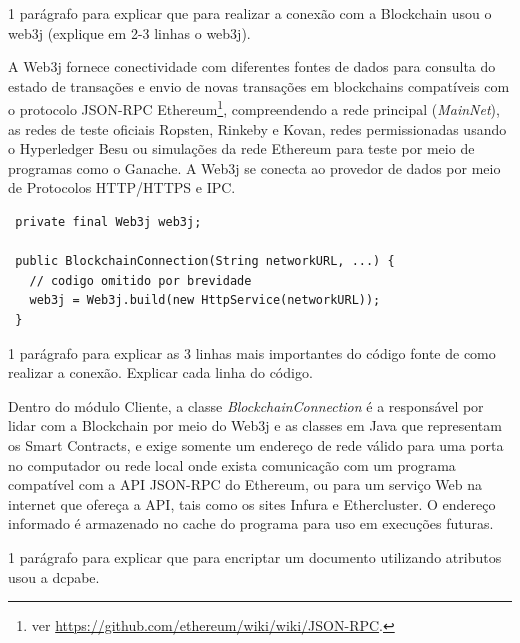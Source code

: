 \documentclass[a4paper,11pt]{article}
\begin{document}
{\color{Magenta} 1 parágrafo para explicar que para realizar a conexão com a Blockchain usou o web3j (explique em 2-3 linhas o web3j).}

A Web3j fornece conectividade com diferentes fontes de dados para consulta do estado de transações e envio de novas transações em blockchains compatíveis com o protocolo JSON-RPC Ethereum\footnote{ver \href{https://github.com/ethereum/wiki/wiki/JSON-RPC}{https://github.com/ethereum/wiki/wiki/JSON-RPC}.}, compreendendo a rede principal (\emph{MainNet}), as redes de teste oficiais Ropsten, Rinkeby e Kovan, redes permissionadas usando o Hyperledger Besu ou simulações da rede Ethereum para teste por meio de programas como o Ganache.
A Web3j se conecta ao provedor de dados por meio de Protocolos HTTP/HTTPS e IPC.


\begin{lstlisting}
 private final Web3j web3j;

 public BlockchainConnection(String networkURL, ...) {
   // codigo omitido por brevidade
   web3j = Web3j.build(new HttpService(networkURL));
 }
\end{lstlisting}

{\color{Magenta} 1 parágrafo para explicar as 3 linhas mais importantes do código fonte de como realizar a conexão. Explicar cada linha do código. }

Dentro do módulo Cliente, a classe \emph{BlockchainConnection} é a responsável por lidar com a Blockchain por meio do Web3j e as classes em Java que representam os Smart Contracts, e exige somente um endereço de rede válido para uma porta no computador ou rede local onde exista comunicação com um programa compatível com a API JSON-RPC do Ethereum, ou para um serviço Web na internet que ofereça a API, tais como os sites Infura e Ethercluster.
O endereço informado é armazenado no cache do programa para uso em execuções futuras.

{\color{Magenta} 1 parágrafo para explicar que para encriptar um documento utilizando atributos usou a dcpabe.}
\end{document}
